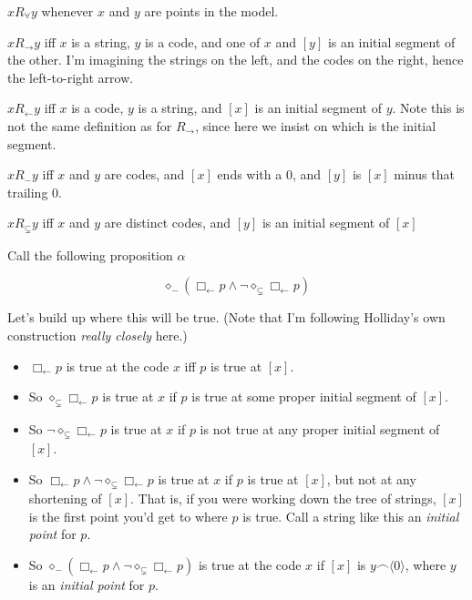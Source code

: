 \documentclass[
  11pt,
  letterpaper,
  DIV=11,
  numbers=noendperiod,
  twoside]{scrartcl}
\providecommand{\tightlist}{%
  \setlength{\itemsep}{0pt}\setlength{\parskip}{0pt}}
\begin{document}
\begin{description}
\tightlist
\item[Universal \(R_\forall\)]
\(xR_{\forall}y\) whenever \(x\) and \(y\) are points in the model.
\item[String-to-code \(R_{\rightarrow}\)]
\(xR_{\rightarrow}y\) iff \(x\) is a string, \(y\) is a code, and one of
\(x\) and \([y]\) is an initial segment of the other. I'm imagining the
strings on the left, and the codes on the right, hence the left-to-right
arrow.
\item[Code-to-string \(R_{\leftarrow}\)]
\(xR_{\leftarrow}y\) iff \(x\) is a code, \(y\) is a string, and \([x]\)
is an initial segment of \(y\). Note this is not the same definition as
for \(R_{\rightarrow}\), since here we insist on which is the initial
segment.
\item[Code-zero-remove: \(R_{-}\)]
\(xR_{-}y\) iff \(x\) and \(y\) are codes, and \([x]\) ends with a 0,
and \([y]\) is \([x]\) minus that trailing 0.
\item[Code-shortening: \(R_{\subsetneq}\)]
\(xR_{\subsetneq}y\) iff \(x\) and \(y\) are distinct codes, and \([y]\)
is an initial segment of \([x]\)
\end{description}

Call the following proposition \(\alpha\)

\[
\diamond_{-}(\Box_{\leftarrow} p \wedge \neg \diamond_{\subsetneq}\Box_{\leftarrow} p)
\]

Let's build up where this will be true. (Note that I'm following
Holliday's own construction \emph{really closely} here.)

\begin{itemize}
\tightlist
\item
  \(\Box_{\leftarrow} p\) is true at the code \(x\) iff \(p\) is true at
  \([x]\).
\item
  So \(\diamond_{\subsetneq}\Box_{\leftarrow} p\) is true at \(x\) if
  \(p\) is true at some proper initial segment of \([x]\).
\item
  So \(\neg \diamond_{\subsetneq}\Box_{\leftarrow} p\) is true at \(x\)
  if \(p\) is not true at any proper initial segment of \([x]\).
\item
  So
  \(\Box_{\leftarrow} p \wedge \neg \diamond_{\subsetneq}\Box_{\leftarrow} p\)
  is true at \(x\) if \(p\) is true at \([x]\), but not at any
  shortening of \([x]\). That is, if you were working down the tree of
  strings, \([x]\) is the first point you'd get to where \(p\) is true.
  Call a string like this an \emph{initial point} for \(p\).
\item
  So
  \(\diamond_{-}(\Box_{\leftarrow} p \wedge \neg \diamond_{\subsetneq}\Box_{\leftarrow} p)\)
  is true at the code \(x\) if \([x]\) is \(y\frown \langle0\rangle\),
  where \(y\) is an \emph{initial point} for \(p\).
\end{itemize}
\end{document}
